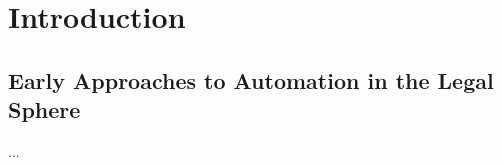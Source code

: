 \chapter{Introduction}
\label{chap:intro}
\chaptermark{}

\section{Early Approaches to Automation in the Legal Sphere}
...




